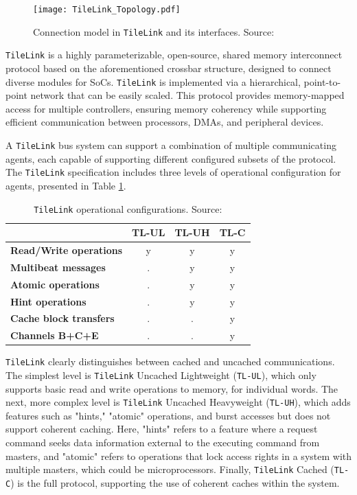 \begin{figure}[h!]
    \centering
    \texttt{[image: TileLink\_Topology.pdf]}
    \caption{Connection model in \texttt{TileLink} and its interfaces. Source: \cite{sifive2017tilelink}}
    \label{fig:tilelink_connection_model}
\end{figure}

\texttt{TileLink} is a highly parameterizable, open-source, shared memory interconnect protocol based on the aforementioned crossbar structure, designed to connect diverse modules for SoCs. \texttt{TileLink} is implemented via a hierarchical, point-to-point network that can be easily scaled. This protocol provides memory-mapped access for multiple controllers, ensuring memory coherency while supporting efficient communication between processors, DMAs, and peripheral devices.

A \texttt{TileLink} bus system can support a combination of multiple communicating agents, each capable of supporting different configured subsets of the protocol. The \texttt{TileLink} specification includes three levels of operational configuration for agents, presented in Table \ref{tab:tilelink_configs}.

\begin{table}[h!]
\centering
\caption{\texttt{TileLink} operational configurations. Source: \cite{sifive2017tilelink}}
\label{tab:tilelink_configs}
\begin{tabular}{|l|c|c|c|}
\hline
 & \textbf{TL-UL} & \textbf{TL-UH} & \textbf{TL-C} \\
\hline
\textbf{Read/Write operations} & y & y & y \\
\textbf{Multibeat messages} & . & y & y \\
\textbf{Atomic operations} & . & y & y \\
\textbf{Hint operations} & . & y & y \\
\textbf{Cache block transfers} & . & . & y \\
\textbf{Channels B+C+E} & . & . & y \\
\hline
\end{tabular}
\end{table}

\texttt{TileLink} clearly distinguishes between cached and uncached communications. The simplest level is \texttt{TileLink} Uncached Lightweight (\texttt{TL-UL}), which only supports basic read and write operations to memory, for individual words. The next, more complex level is \texttt{TileLink} Uncached Heavyweight (\texttt{TL-UH}), which adds features such as "hints," "atomic" operations, and burst accesses but does not support coherent caching. Here, "hints" refers to a feature where a request command seeks data information external to the executing command from masters, and "atomic" refers to operations that lock access rights in a system with multiple masters, which could be microprocessors. Finally, \texttt{TileLink} Cached (\texttt{TL-C}) is the full protocol, supporting the use of coherent caches within the system.

